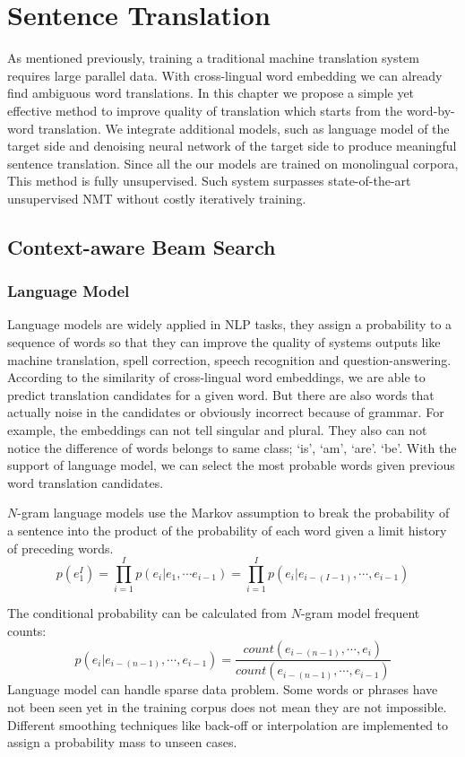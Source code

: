 \chapter{Sentence Translation}
As mentioned previously, training a traditional machine translation system requires large parallel data. With cross-lingual word embedding we can already find ambiguous word translations. In this chapter we propose a simple yet effective method to improve quality of translation which starts from the word-by-word translation. We integrate additional models, such as language model of the target side and denoising neural network of the target side to produce meaningful sentence translation. Since all the our models  are trained on monolingual corpora, This  method is fully unsupervised. Such system surpasses state-of-the-art unsupervised NMT without costly iteratively training.  
\section{Context-aware Beam Search}
	\subsection{Language Model}
		Language models are widely applied in NLP tasks, they assign a probability to a sequence of words so that they can improve the quality of systems outputs like machine translation, spell correction, speech recognition and question-answering. According to the similarity of cross-lingual word embeddings, we are able to predict translation candidates for a given word. But there are also words that actually noise in the candidates or obviously incorrect because of grammar. For example, the embeddings can not tell singular and plural. They also can not notice the difference of words belongs to same class; `is', `am', `are'. `be'. With the support of language model, we can select the most probable words given previous word translation candidates. 
		
		${N}$-gram language models use the Markov assumption to break the probability of a sentence into the product of the probability of each word given a limit history of preceding words. 
		\[ p(e_1^I) = \prod_{i=1}^{I} p(e_i| e_1, \cdots	e_{i-1}) = \prod_{i=1}^I {p(e_i | e_{i-(I-1)}, \cdots , e_{i-1})}  \] 
		
		The conditional probability can be calculated from ${N}$-gram model frequent counts:
		\[p(e_i | e_{i-(n-1)}, \cdots , e_{i-1}) = \frac{count(e_{i-(n-1)}, \cdots, e_i)}{count(e_{i-(n-1)}, \cdots, e_{i-1})} \]
		Language model can handle sparse data problem. Some words or phrases have not been seen yet in the training corpus does not mean they are not impossible. Different smoothing techniques like back-off or interpolation are implemented to assign a probability mass to unseen cases.
